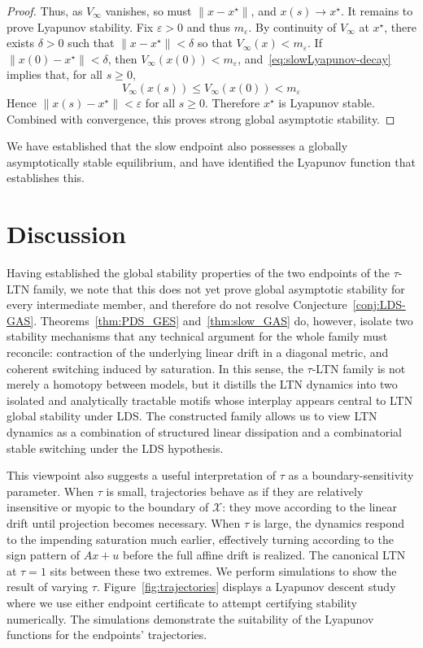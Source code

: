 \documentclass[letterpaper, conference]{ieeeconf}
\newcommand{\X}{\mathcal X}
\newcommand{\1}{\mathbf{1}}
\begin{document}
\begin{proof}
Thus, as \(V_\infty\) vanishes, so must \(\lVert x-x^\star\rVert\), and \(x(s)\to x^\star\).
It remains to prove Lyapunov stability. Fix \(\varepsilon>0\) and thus \(m_\varepsilon\).
By continuity of \(V_\infty\) at \(x^\star\), there exists \(\delta>0\) such that \(\lVert x-x^\star\rVert<\delta\) so that
\(V_\infty(x)<m_\varepsilon\).
If \(\lVert x(0)-x^\star\rVert<\delta\), then \(V_\infty(x(0))<m_\varepsilon\), and~\eqref{eq:slowLyapunov-decay} implies that, for all \(s\ge0\),
\[V_\infty(x(s))\le V_\infty(x(0))<m_\varepsilon\]
Hence \(\lVert x(s)-x^\star\rVert<\varepsilon\) for all \(s\ge0\). 
Therefore \(x^\star\) is Lyapunov stable. 
Combined with convergence, this proves strong global asymptotic stability.
\end{proof}

We have established that the slow endpoint also possesses a globally asymptotically stable equilibrium, and have identified the Lyapunov function that establishes this.

\section{Discussion}

Having established the global stability properties of the two endpoints of the $\tau$-LTN family, we note that this does not yet prove global asymptotic stability for every intermediate member, and therefore do not resolve Conjecture~\ref{conj:LDS-GAS}. 
Theorems~\ref{thm:PDS_GES} and~\ref{thm:slow_GAS} do, however, isolate two stability mechanisms that any technical argument for the whole family must reconcile: contraction of the underlying linear drift in a diagonal metric, and coherent switching induced by saturation. 
In this sense, the $\tau$-LTN family is not merely a homotopy between models, but it distills the LTN dynamics into two isolated and analytically tractable motifs whose interplay appears central to LTN global stability under LDS.
The constructed family allows us to view LTN dynamics as a combination of structured linear dissipation and a combinatorial stable switching under the LDS hypothesis.

This viewpoint also suggests a useful interpretation of $\tau$ as a boundary-sensitivity parameter. 
When $\tau$ is small, trajectories behave as if they are relatively insensitive or myopic to the boundary of $\X$: they move according to the linear drift until projection becomes necessary.
When $\tau$ is large, the dynamics respond to the impending saturation much earlier, effectively turning according to the sign pattern of $Ax+u$ before the full affine drift is realized. 
The canonical LTN at $\tau=1$ sits between these two extremes.%
We perform simulations to show the result of varying \(\tau\).
Figure~\ref{fig:trajectories} displays a Lyapunov descent study where we use either endpoint certificate to attempt certifying stability numerically.
The simulations demonstrate the suitability of the Lyapunov functions for the endpoints' trajectories.
\end{document}
